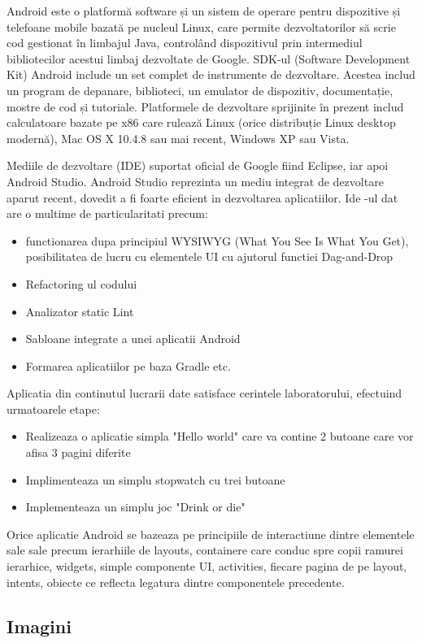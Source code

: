 	Android este o platformă software și un sistem de operare pentru dispozitive și telefoane mobile bazată pe nucleul Linux, care permite dezvoltatorilor să scrie cod gestionat în limbajul Java, controlând dispozitivul prin intermediul bibliotecilor acestui limbaj dezvoltate de Google. SDK-ul (Software Development Kit) Android include un set complet de instrumente de dezvoltare. Acestea includ un program de depanare, biblioteci, un emulator de dispozitiv, documentație, mostre de cod și tutoriale. Platformele de dezvoltare sprijinite în prezent includ calculatoare bazate pe x86 care rulează Linux (orice distribuție Linux desktop modernă), Mac OS X 10.4.8 sau mai recent, Windows XP sau Vista. 
	
	Mediile de dezvoltare (IDE) suportat oficial de Google fiind Eclipse, iar apoi Android Studio. Android Studio reprezinta un mediu integrat de dezvoltare aparut recent, dovedit a fi foarte eficient in dezvoltarea aplicatiilor. Ide -ul dat are o multime de particularitati precum: 
\begin{itemize}
	\item functionarea dupa principiul WYSIWYG (What You See Is What You Get), posibilitatea de lucru cu elementele UI cu ajutorul functiei Dag-and-Drop
	\item Refactoring ul codului
	\item Analizator static Lint
	\item Sabloane integrate a unei aplicatii Android
	\item Formarea aplicatiilor pe baza Gradle etc.
\end{itemize}
	Aplicatia din continutul lucrarii date satisface cerintele laboratorului, efectuind urmatoarele etape:
\begin{itemize}
\item Realizeaza o aplicatie simpla "Hello world" care va contine 2 butoane care vor afisa 3 pagini diferite
\item Implimenteaza un simplu stopwatch cu trei butoane
\item Implementeaza un simplu joc "Drink or die" 
\end{itemize}
	
	Orice aplicatie Android se bazeaza pe principiile de interactiune dintre elementele sale sale precum ierarhiile de layouts, containere care conduc spre copii ramurei ierarhice, widgets, simple componente UI, activities, fiecare pagina de pe layout, intents, obiecte ce reflecta legatura dintre componentele precedente.


\subsection{Imagini}

